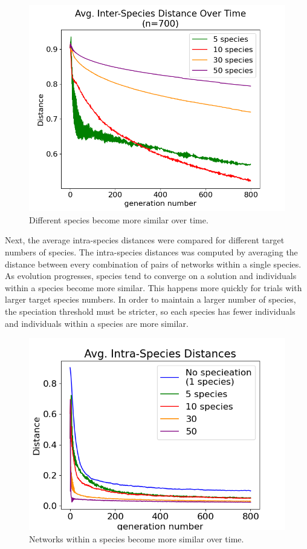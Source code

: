 \documentclass[12pt]{report}
\begin{document}
\begin{figure}
\centering
    \includegraphics[width=15cm]{images/avg_species_differences.png}
    \caption[Average inter-species distance over time]{Different species become more similar over time.}
    \label{fig:avg_species_differences}
\end{figure}

Next, the average intra-species distances were compared for different target numbers of species. The intra-species distances was computed by averaging the distance between every combination of pairs of networks within a single species. As evolution progresses, species tend to converge on a solution and individuals within a species become more similar. This happens more quickly for trials with larger target species numbers. In order to maintain a larger number of species, the speciation threshold must be stricter, so each species has fewer individuals and individuals within a species are more similar.

\begin{figure}
\centering
    \includegraphics[width=15cm]{images/intraspecies_distance.png}
    \caption[Average intra-species distance over time]{Networks within a species become more similar over time.}
    \label{fig:avg_species_differences}
\end{figure}
\end{document}
